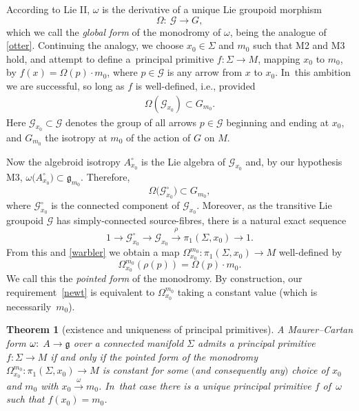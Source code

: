 \documentclass[pdftex]{sigma}%
\numberwithin{equation}{section}
\newtheorem{Theorem}{Theorem}[section]
\begin{document}
According to Lie II, $\omega $ is the derivative of a unique Lie
groupoid morphism
\begin{equation}\label{global}
 \Omega \colon\ {\mathcal G} \rightarrow G,
\end{equation}
which we call the {\it global form} of the monodromy of $\omega $,
being the analogue of \eqref{otter}. Continuing the analogy, we
choose $x_0 \in \Sigma $ and $m_0$ such that M2 and M3 hold, and
attempt to define a~principal primitive
$f \colon \Sigma \rightarrow M$, mapping $x_0$ to $m_0$, by
$f(x)=\Omega(p)\cdot m_0 $, where $p \in {\mathcal G} $ is any arrow
from $x$ to $x_0$. In~this ambition we are successful, so long as $f$
is well-defined, i.e., provided
\begin{gather}
\Omega({\mathcal G}_{x_0}) \subset G_{m_0}.\label{newt}
\end{gather}
Here ${\mathcal G}_{x_0} \subset {\mathcal G}$ denotes
the group of all arrows $p \in {\mathcal G} $ beginning and ending at
$x_0$, and $G_{m_0}$ the isotropy at $m_0 $ of the action of $G$ on
$M$.

Now the algebroid isotropy $A^\circ_{x_0}$ is the Lie algebra of
${\mathcal G}_{x_0} $ and, by our hypothesis M3,
$\omega\big(A^\circ_{x_0}\big) \allowbreak\subset {\mathfrak g}_{m_0}$. Therefore,
\begin{equation} \Omega\big({\mathcal G}_{x_0}^\circ\big) \subset G_{m_0},
\label{warbler}
\end{equation}
where ${\mathcal G}_{x_0}^\circ$ is the connected
component of ${\mathcal G}_{x_0}$. Moreover, as the transitive Lie
groupoid ${\mathcal G} $ has simply-connected source-fibres, there is
a natural exact sequence
\begin{equation*}
1 \rightarrow {\mathcal G}_{x_0}^\circ \rightarrow
{\mathcal G}_{x_0}\xrightarrow{\rho} \pi_1(\Sigma, x_0) \rightarrow 1.
\end{equation*} From this and \eqref{warbler} we obtain a map
$\Omega_{x_0}^{m_0} \colon \pi_1(\Sigma ,x_0) \rightarrow M$
well-defined by
\begin{equation*} \Omega_{x_0}^{m_0}(\rho ( p))=\Omega(p) \cdot m_0.
\end{equation*}
We call this the {\it pointed form} of the
monodromy. By construction, our requirement~\eqref{newt} is equivalent
to $\Omega_{x_0}^{m_0}$ taking a constant value (which is necessarily~$m_0$).

\begin{Theorem}[existence and uniqueness of principal primitives]\label{outlineT}
 A Maurer--Cartan form $\omega{\rm :}$ $A \rightarrow {\mathfrak g} $
 over a connected manifold $\Sigma $ admits a principal primitive
 $f \colon \Sigma \rightarrow M$ if and only if the pointed form of
 the monodromy
 $\Omega_{x_0}^{m_0} \colon \pi_1(\Sigma, x_0) \rightarrow M$ is
 constant for some $($and consequently any$)$ choice of $x_0$ and $m_0$
 with $x_0\xrightarrow{\omega}m_0$. In~that case there is a unique
 principal primitive $f$ of~$\omega $ such that $f(x_0)=m_0$.
\end{Theorem}
\end{document}
